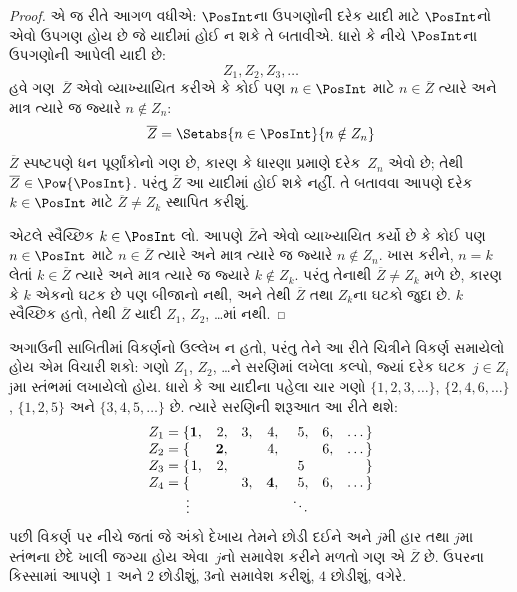 \begin{proof}
એ જ રીતે આગળ વધીએ: $\PosInt$ના ઉપગણોની દરેક યાદી માટે
$\PosInt$નો એવો ઉપગણ હોય છે જે યાદીમાં હોઈ ન શકે તે બતાવીએ.
ધારો કે નીચે $\PosInt$ના ઉપગણોની આપેલી યાદી છે:
\[
Z_{1}, Z_{2}, Z_{3}, \dots
\]
હવે ગણ~$\overline{Z}$ એવો વ્યાખ્યાયિત કરીએ કે કોઈ પણ
$n \in \PosInt$ માટે $n \in \overline{Z}$ ત્યારે અને માત્ર
ત્યારે જ જ્યારે $n \notin Z_{n}$:
\[
\overline{Z} = \Setabs{n \in \PosInt}{n \notin Z_n}
\]
$\overline{Z}$ સ્પષ્ટપણે ધન પૂર્ણાંકોનો ગણ છે, કારણ કે ધારણા
પ્રમાણે દરેક~$Z_n$ એવો છે; તેથી $\overline{Z} \in
\Pow{\PosInt}$. પરંતુ $\overline{Z}$ આ યાદીમાં હોઈ શકે નહીં.
તે બતાવવા આપણે દરેક $k \in \PosInt$ માટે $\overline{Z} \neq
Z_k$ સ્થાપિત કરીશું.

એટલે સ્વૈચ્છિક $k \in \PosInt$ લો. આપણે $\overline{Z}$ને એવો
વ્યાખ્યાયિત કર્યો છે કે કોઈ પણ $n \in \PosInt$ માટે
$n \in \overline{Z}$ ત્યારે અને માત્ર ત્યારે જ જ્યારે
$n \notin Z_n$. ખાસ કરીને, $n=k$ લેતાં
$k \in \overline{Z}$ ત્યારે અને માત્ર ત્યારે જ જ્યારે
$k \notin Z_k$. પરંતુ તેનાથી $\overline{Z} \neq Z_k$ મળે છે,
કારણ કે $k$ એકનો ઘટક છે પણ બીજાનો નથી, અને તેથી
$\overline{Z}$ તથા $Z_k$ના ઘટકો જુદા છે. $k$ સ્વૈચ્છિક
હતો, તેથી $\overline{Z}$ યાદી $Z_1$, $Z_2$, \dots{}માં નથી.
\end{proof}

\begin{explain}
અગાઉની સાબિતીમાં વિકર્ણનો ઉલ્લેખ ન હતો, પરંતુ તેને આ રીતે
ચિત્રીને વિકર્ણ સમાયેલો હોય એમ વિચારી શકો: ગણો $Z_1$, $Z_2$,
\dots{}ને સરણિમાં લખેલા કલ્પો, જ્યાં દરેક ઘટક~$j \in Z_i$
jમા સ્તંભમાં લખાયેલો હોય. ધારો કે આ યાદીના પહેલા ચાર ગણો
$\{1,2,3,\dots\}$, $\{2, 4, 6, \dots\}$, $\{1,2,5\}$ અને
$\{3,4,5,\dots\}$ છે. ત્યારે સરણિની શરૂઆત આ રીતે થશે:
\[
\begin{array}{r@{}rrrrrrr}
  Z_1 = \{ & \mathbf{1}, & 2, & 3, & 4, & 5, & 6, & \dots\}\\
  Z_2 = \{ &  & \mathbf{2}, &  & 4, &  & 6, & \dots\}\\
  Z_3 = \{ & 1, & 2, &  &  & 5\phantom{,} &  & \}\\
  Z_4 = \{ &  &  & 3, & \mathbf{4}, & 5, & 6, & \dots\}\\
  \vdots & & & & & \ddots
\end{array}
\]
પછી વિકર્ણ પર નીચે જતાં જે અંકો દેખાય તેમને છોડી દઈને અને
$j$મી હાર તથા $j$મા સ્તંભના છેદે ખાલી જગ્યા હોય એવા~$j$નો
સમાવેશ કરીને મળતો ગણ એ $\overline{Z}$ છે. ઉપરના કિસ્સામાં આપણે
$1$ અને $2$ છોડીશું, $3$નો સમાવેશ કરીશું, $4$ છોડીશું, વગેરે.
\end{explain}

